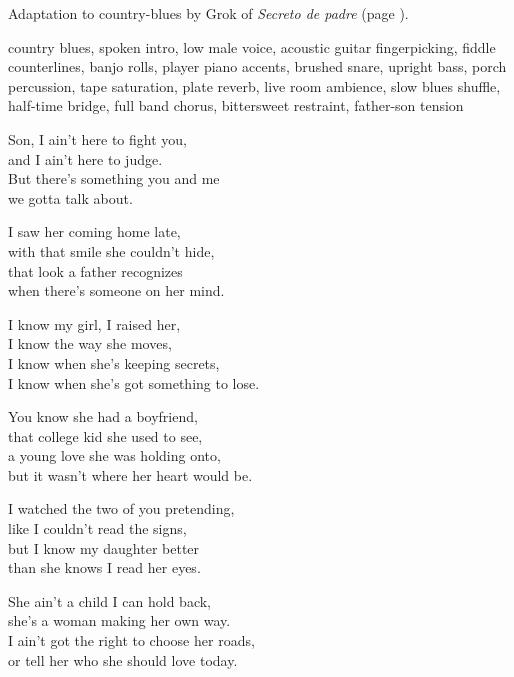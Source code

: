 
\begin{notes}
Adaptation to country-blues by Grok of \emph{Secreto de padre} (page \pageref{sec:secreto-de-padre}).
\end{notes}
\begin{style}
country blues, spoken intro, low male voice, acoustic guitar fingerpicking, fiddle counterlines, banjo rolls, player piano accents, brushed snare, upright bass, porch percussion, tape saturation, plate reverb, live room ambience, slow blues shuffle, half-time bridge, full band chorus, bittersweet restraint, father-son tension
\end{style}
\begin{lyrics}

Son, I ain't here to fight you,\\
and I ain't here to judge.\\
But there's something you and me\\
we gotta talk about.


I saw her coming home late,\\
with that smile she couldn't hide,\\
that look a father recognizes\\
when there's someone on her mind.

I know my girl, I raised her,\\
I know the way she moves,\\
I know when she's keeping secrets,\\
I know when she's got something to lose.

You know she had a boyfriend,\\
that college kid she used to see,\\
a young love she was holding onto,\\
but it wasn't where her heart would be.

I watched the two of you pretending,\\
like I couldn't read the signs,\\
but I know my daughter better\\
than she knows I read her eyes.


She ain't a child I can hold back,\\
she's a woman making her own way.\\
I ain't got the right to choose her roads,\\
or tell her who she should love today.


\end{lyrics}
